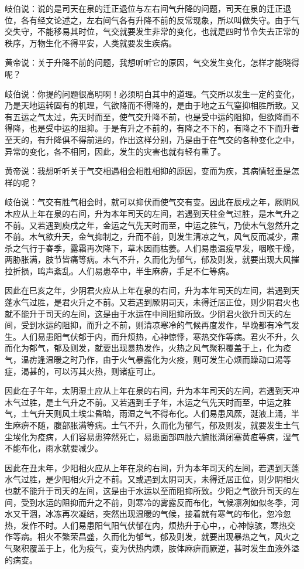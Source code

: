 \documentclass[a4paper,12pt,UTF8,twoside]{ctexbook}
\begin{document}
岐伯说：说的是司天在泉的迁正退位与左右间气升降的问题，司天在泉的迁正退位，各有经文论述之，左右间气各有升降不前的反常现象，所以叫做失守。由于气交失守，不能移易其时位，气交就要发生非常的变化，也就是四时节令失去正常的秩序，万物生化不得平安，人类就要发生疾病。

黄帝说：关于升降不前的问题，我想听听它的原因，气交发生变化，怎样才能晓得呢？

岐伯说：你提的问题很高明啊！必须明白其中的道理。气交所以发生一定的变化，乃是天地运转固有的机理，气欲降而不得降的，是由于地之五气窒抑相胜所致。又有五运之气太过，先天时而至，使气交升降不前，也是受中运的阻抑，但欲降而不得降，也是受中运的阻抑。于是有升之不前的，有降之不下的，有降之不下而升者至天的，有升降俱不得前进的，作出这样分别，乃是由于在气交的各种变化之中，异常的变化，各不相同，因此，发生的灾害也就有轻有重了。

黄帝说：我想听听关于气交相遇相会相胜相抑的原因，变而为疾，其病情轻重是怎样的呢？

岐伯说：气交有胜气相会时，就可以抑伏而使气交有变。因此在辰戌之年，厥阴风木应从上年在泉的右间，升为本年司天的左间，若遇到天柱金气过胜，是木气升之不前。又若遇到庾戌之年，金运之气先天时而至，中运之胜气，乃使木气忽然升之不前。木气欲升天，金气抑制之，升而不前，则发生清凉之气，风气反而减少，肃杀之气行于春季，露霜再次降下，草木因而枯萎。人们易患温疫早发，咽喉干燥，两胁胀满，肢节皆痛等病。木气不升，久而化为郁气，郁及则发，就要出现大风摧拉折损，鸣声紊乱。人们易患卒中，半生麻痹，手足不仁等病。

因此在巳亥之年，少阴君火应从上年在泉的右间，升为本年司天的左间，若遇到天蓬水气过胜，是君火升之不前。又若遇到厥阴司天，未得迁居正位，则少阴君火也就不能升于司天的左间，这是由于水运在中间阻抑所致。少阴君火欲升司天的左间，受到水运的阻抑，而升之不前，则清凉寒冷的气候再度发作，早晚都有冷气发生。人们易患阳气伏郁于内，而升烦热，心神惊悸，寒热交作等病。君火不升，久而化为郁气，郁及则发，就要出现暴热发作，火热之风气聚积覆盖于上，化为疫气，温疠逢温暖之时乃作，由于火气暴露化为火疫，则可发生心烦而躁动口渴等症，渴甚的，可以泻其火热，则诸症可止。

因此在子午年，太阴湿土应从上年在泉的右间，升为本年司天的左间，若遇到天冲木气过胜，是土气升之不前。又若遇到壬子年，木运之气先天时而至，中运之胜气，土气升天则风土埃尘昏暗，雨湿之气不得布化。人们易患风厥，涎液上涌，半生麻痹不随，腹部胀满等病。土气不升，久而化为郁气，郁及则发，就要发生土气尘埃化为疫病，人们容易患猝然死亡，易患面部四肢六腑胀满闭塞黄疸等病，湿气不能布化，雨水就要减少。

因此在丑未年，少阳相火应从上年在泉的右间，升为本年司天的左间，若遇到天蓬水气过胜，是少阳相火升之不前。又或遇到太阴司天，未得迁居正位，则少阴相火也就不能升于司天的左间，这是由于水运以至而阻抑所致。少阳之气欲升司天的左间，受到水运的阻抑而升之不前，则寒冷的雾露反而布化，气候凛冽如似冬季，河水又干涸，冰冻再次凝结，突然出现温暖的气候，接着就有寒气的布化，忽冷忽热，发作不时。人们易患阳气阳气伏郁在内，烦热升于心中，，心神惊骇，寒热交作等病。相火不繁荣昌盛，久而化为郁气，郁及则发，就要出现暴热之气，风火之气聚积覆盖于上，化为疫气，变为伏热内烦，肢体麻痹而厥逆，甚时发生血液外溢的病变。
\end{document}
